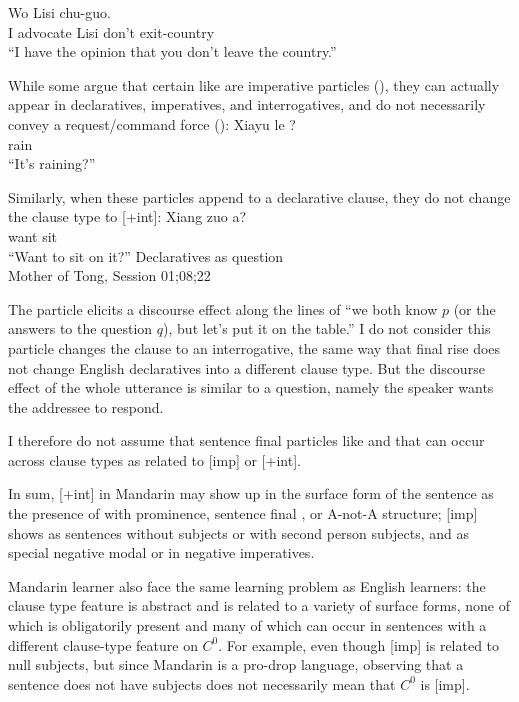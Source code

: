 \gll Wo  Lisi  chu-guo.\\
I advocate Lisi don't exit-country\\
\trans ``I have the opinion that you don't leave the country.'' \hfill \textcite[p.458]{lithompson}
\eex

While some argue that certain  like  are imperative particles (\cite{zhudexi,chao1968,lithompson}), they can actually appear in declaratives, imperatives, and interrogatives, and do not necessarily convey a request/command force (\cite{YY2021}):
Xiayu le ?\\
rain \Asp{} \Sfp{}\\
\trans ``It's raining?''
\eex

Similarly, when these particles append to a declarative clause, they do not change the clause type to [+int]:
\gll %
Xiang zuo a?\\
want sit \Sfp{}\\
``Want to sit on it?''
\hfill Declaratives as question\\
Mother of Tong, Session 01;08;22
\eex

The particle  elicits a discourse effect along the lines of ``we both know $p$ (or the answers to the question $q$), but let's put it on the table.'' I do not consider this particle changes the clause to an interrogative, the same way that final rise does not change English declaratives into a different clause type. But the discourse effect of the whole utterance is similar to a question, namely the speaker wants the addressee to respond. 

I therefore do not assume that sentence final particles like  and  that can occur across clause types as related to [imp] or [+int].

In sum, [+int] in Mandarin may show up in the surface form of the sentence as the presence of \twh{} with prominence, sentence final , or A-not-A structure; [imp] shows as sentences without subjects or with second person subjects, and as special negative modal  or  in negative imperatives. 

Mandarin learner also face the same learning problem as English learners: the clause type feature is abstract and is related to a variety of surface forms, none of which is obligatorily present and many of which can occur in sentences with a different clause-type feature on $C^{0}$. For example, even though [imp] is related to null subjects, but since Mandarin is a pro-drop language, observing that a sentence does not have subjects does not necessarily mean that $C^{0}$ is [imp].  


